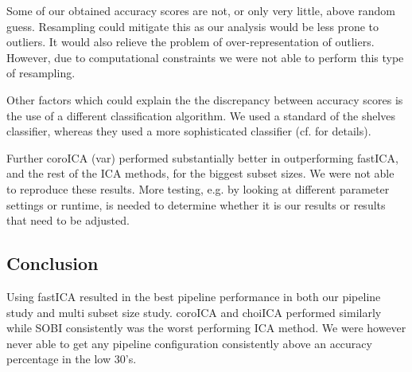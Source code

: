 	Some of our obtained accuracy scores are not, or only very little, above random guess. Resampling could mitigate this as our analysis would be less prone to outliers. It would also relieve the problem of over-representation of outliers. However, due to computational constraints we were not able to perform this type of resampling. 

	Other factors which could explain the the discrepancy between accuracy scores is the use of a different classification algorithm. We used a standard of the shelves classifier, whereas they used a more sophisticated classifier (cf. \cite[p.29]{pfister2019} for details).

	Further coroICA (var) performed substantially better in \cite{pfister2019} outperforming fastICA, and the rest of the ICA methods, for the biggest subset sizes. We were not able to reproduce these results. More testing, e.g. by looking at different parameter settings or runtime, is needed to determine whether it is our results or \cite{pfister2019} results that need to be adjusted. 

\subsection{Conclusion}

	Using fastICA resulted in the best pipeline performance in both our pipeline study and multi subset size study. coroICA and choiICA performed similarly while SOBI consistently was the worst performing ICA method. We were however never able to get any pipeline configuration consistently above an accuracy percentage in the low 30's.

